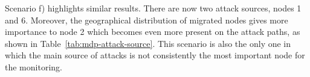 Scenario f) highlights similar results. There are now two attack sources, nodes 1 and 6. Moreover, the geographical distribution of migrated nodes gives more importance to node 2 which becomes even more present on the attack paths, as shown in Table~\ref{tab:mdp-attack-source}. This scenario is also the only one in which the main source of attacks is not consistently the most important node for the monitoring.




% 
% 


